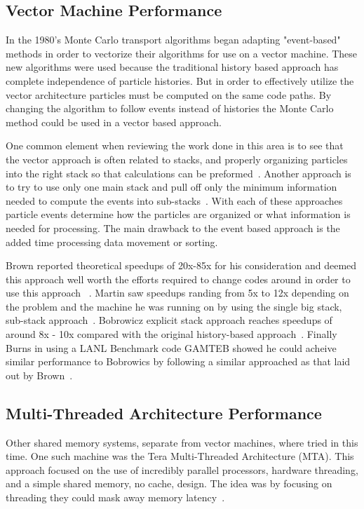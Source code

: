 \subsection*{Vector Machine Performance}

%
In the 1980's Monte Carlo transport algorithms began adapting "event-based" methods in order to vectorize their algorithms for use on a vector machine.
%
These new algorithms were used because the traditional history based approach has complete independence of particle histories.
%
But in order to effectively utilize the vector architecture particles must be computed on the same code paths.
%
By changing the algorithm to follow events instead of histories the Monte Carlo method could be used in a vector based approach. ~\cite{martin1986monte}
%

%
One common element when reviewing the work done in this area is to see that the vector approach is often related to stacks, and properly organizing particles into the right stack so that calculations can be preformed~\cite{brown1984monte, bobrowicz1984vectorized}.
%
Another approach is to try to use only one main stack and pull off only the minimum information needed to compute the events into sub-stacks~\cite{martin1986monte}.
%
With each of these approaches particle events determine how the particles are organized or what information is needed for processing.
%
The main drawback to the event based approach is the added time processing data movement or sorting.
%

%
Brown reported theoretical speedups of 20x-85x for his consideration and deemed this approach well worth the efforts required to change codes around in order to use this approach ~\cite{brown1984monte}.
%
Martin saw speedups randing from 5x to 12x depending on the problem and the machine he was running on by using the single big stack, sub-stack approach~\cite{martin1986monte}.
%
Bobrowicz explicit stack approach reaches speedups of around 8x - 10x compared with the original history-based approach~\cite{bobrowicz1984vectorized}.
%
Finally Burns in using a LANL Benchmark code GAMTEB showed he could acheive similar performance to Bobrowics by following a similar approached as that laid out by Brown~\cite{burns1989vectorization}.
%

\subsection*{Multi-Threaded Architecture Performance}

%
Other shared memory systems, separate from vector machines, where tried in this time.
%
One such machine was the Tera Multi-Threaded Architecture (MTA).
%
This approach focused on the use of incredibly parallel processors, hardware threading, and a simple shared memory, no cache, design.
%
The idea was by focusing on threading they could mask away memory latency~\cite{majumdar2000parallel, snavely1998multi}.
%

